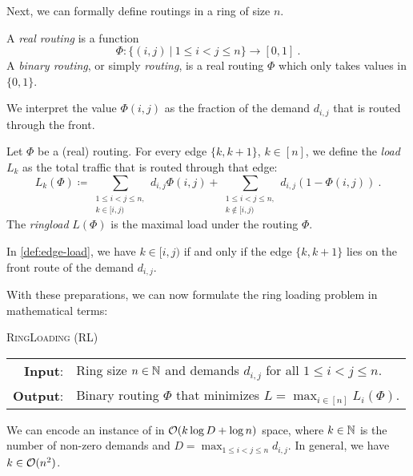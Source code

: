 Next, we can formally define routings in a ring of size $n$.
\begin{definition}[Routing]
	\label{def:routing}
	A \emph{real routing} is a function 
	\begin{equation}
		\Phi: \{(i, j)\ | \ 1 \leq i < j \leq n\} \rightarrow [0, 1] \ .
	\end{equation}
	A \emph{binary routing}, or simply \emph{routing}, is a real routing $\Phi$ which only takes values in $\{0, 1\}$. 
\end{definition}
We interpret the value $\Phi(i, j)$ as the fraction of the demand $d_{i, j}$ that is routed through the front.

\begin{definition}
	\label{def:edge-load}
	Let $\Phi$ be a (real) routing.
	For every edge $\{k, k+1\}$, $k \in [n]$, we define the \emph{load} $L_k$ as the total traffic that is routed through that edge:
	\begin{equation}
		\label{eq:edge-load}
		L_k(\Phi) \coloneqq \sum_{\substack{1 \leq i < j \leq n,\\ k \in [i, j)}} d_{i, j} \Phi(i, j) + \sum_{\substack{1 \leq i < j \leq n,\\ k \notin [i, j)}} d_{i, j} (1 - \Phi(i, j)) \ .
	\end{equation}
	The \emph{ringload} $L(\Phi)$ is the maximal load under the routing $\Phi$.
\end{definition}
In \cref{def:edge-load}, we have $k \in [i, j)$ if and only if the edge $\{k, k+1\}$ lies on the front route of the demand $d_{i, j}$.


With these preparations, we can now formulate the ring loading problem in mathematical terms:
\begin{center}
	\begin{mdframed}
		\centering
		\textsc{RingLoading} (\textsc{RL})\\[0.7em]
		\begin{tabular}{rl}
			{\bfseries Input}: & Ring size $n \in \mathbb{N}$ and demands $d_{i, j}$ for all $1 \leq i<j\leq n$.\\
			{\bfseries Output}: & Binary routing $\Phi$ that minimizes $L = \max_{i \in [n]} L_i(\Phi)$.
		\end{tabular}
	\end{mdframed}
\end{center}
We can encode an instance of \RL in $\mathcal{O}(k \log D + \log n)$ space, where $k \in \mathbb{N}$ is the number of non-zero demands and $D = \max_{1 \leq i < j \leq n}d_{i, j}$.
In general, we have $k \in \mathcal{O}(n^2)$.

